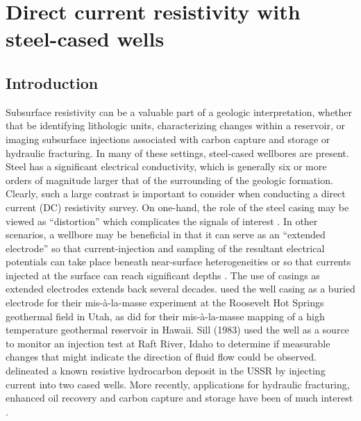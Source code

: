 
\chapter{Direct current resistivity with steel-cased wells}
\label{ch:casing-dc}

\section{Introduction}

Subsurface resistivity can be a valuable part of a geologic interpretation, whether that be identifying lithologic units, characterizing changes within a reservoir, or imaging subsurface injections associated with carbon capture and storage or hydraulic fracturing. In many of these settings, steel-cased wellbores are present. Steel has a significant electrical conductivity, which is generally six or more orders of magnitude larger that of the surrounding of the geologic formation. Clearly, such a large contrast is important to consider when conducting a direct current (DC) resistivity survey. On one-hand, the role of the steel casing may be viewed as ``distortion'' which complicates the signals of interest \citep{Wait1983, Holladay1984, Johnston1987}. In other scenarios, a wellbore may be beneficial in that it can serve as an ``extended electrode'' so that current-injection and sampling of the resultant electrical potentials can take place beneath near-surface heterogeneities \citep{Ramirez1996, Rucker2010, Rucker2012, Ronczka2015} or so that currents injected at the surface can reach significant depths \citep{Schenkel1994, Weiss2016, hoversten2017borehole}. The use of casings as extended electrodes extends back several decades. \cite{Sill1978} used the well casing as a buried electrode for their mis-\`a-la-masse experiment at the Roosevelt Hot Springs geothermal field in Utah, as did \cite{osti_6375177} for their mis-\`a-la-masse mapping of a high temperature geothermal reservoir in Hawaii. Sill (1983) used the well as a source to monitor an injection test at Raft River, Idaho to determine if measurable changes that might indicate the direction of fluid flow could be observed. \cite{Rocroi1985} delineated a known resistive hydrocarbon deposit in the USSR by injecting current into two cased wells. More recently, applications for hydraulic fracturing, enhanced oil recovery and carbon capture and storage have been of much interest \citep{Commer2015, Um2015, Weiss2016, hoversten2017borehole}.

